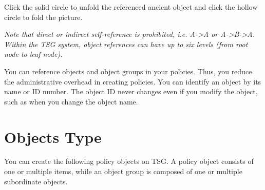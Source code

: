 Click the solid circle to unfold the referenced ancient object and click the hollow circle to fold the picture.


\notemark\textit{Note that direct or indirect self-reference is prohibited, i.e. A->A or A->B->A. Within the TSG system, object references can have up to six levels (from root node to leaf node).}


You can reference objects and object groups in your policies. Thus, you reduce the administrative overhead in creating policies. You can identify an object by its name or ID number. The object ID never changes even if you modify the object, such as when you change the object name. 


\section*{\hypertarget{link:Objects Type}{Objects Type}}
\label{sec:objects:type}

You can create the following policy objects on TSG. A policy object consists of one or multiple items, while an object group is composed of one or multiple subordinate objects.



